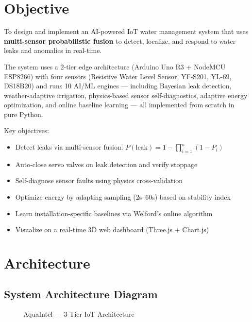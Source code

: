 \documentclass[12pt,a4paper]{article}
\begin{document}
\section{Objective}

To design and implement an AI-powered IoT water management system that uses \textbf{multi-sensor probabilistic fusion} to detect, localize, and respond to water leaks and anomalies in real-time.

The system uses a 2-tier edge architecture (Arduino Uno R3 + NodeMCU ESP8266) with four sensors (Resistive Water Level Sensor, YF-S201, YL-69, DS18B20) and runs 10 AI/ML engines — including Bayesian leak detection, weather-adaptive irrigation, physics-based sensor self-diagnostics, adaptive energy optimization, and online baseline learning — all implemented from scratch in pure Python.

Key objectives:
\begin{itemize}
    \item Detect leaks via multi-sensor fusion: $P(\text{leak}) = 1 - \prod_{i=1}^{n}(1 - P_i)$
    \item Auto-close servo valves on leak detection and verify stoppage
    \item Self-diagnose sensor faults using physics cross-validation
    \item Optimize energy by adapting sampling (2s--60s) based on stability index
    \item Learn installation-specific baselines via Welford's online algorithm
    \item Visualize on a real-time 3D web dashboard (Three.js + Chart.js)
\end{itemize}


\section{Architecture}

\subsection{System Architecture Diagram}

\begin{figure}[H]
    \centering
    \caption{AquaIntel — 3-Tier IoT Architecture}
\end{figure}
\end{document}
